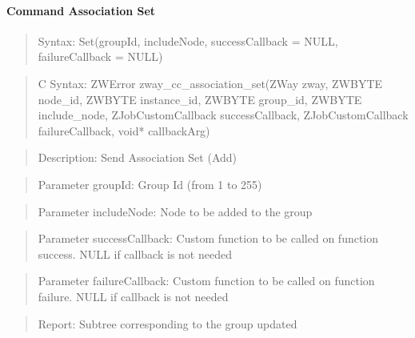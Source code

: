 \paragraph{Command Association Set}
\begin{quote}Syntax: Set(groupId, includeNode, successCallback = NULL, failureCallback = NULL)\end{quote}
\begin{quote}C Syntax: ZWError zway\_cc\_association\_set(ZWay zway, ZWBYTE node\_id, ZWBYTE instance\_id, ZWBYTE group\_id, ZWBYTE include\_node, ZJobCustomCallback successCallback, ZJobCustomCallback failureCallback, void* callbackArg)\end{quote}
\begin{quote}Description: Send Association Set (Add)\end{quote}
\begin{quote}Parameter groupId: Group Id (from 1 to 255)\end{quote}
\begin{quote}Parameter includeNode: Node to be added to the group\end{quote}
\begin{quote}Parameter successCallback: Custom function to be called on function success. NULL if callback is not needed\end{quote}
\begin{quote}Parameter failureCallback: Custom function to be called on function failure. NULL if callback is not needed\end{quote}
\begin{quote}Report: Subtree corresponding to the group updated\end{quote}

